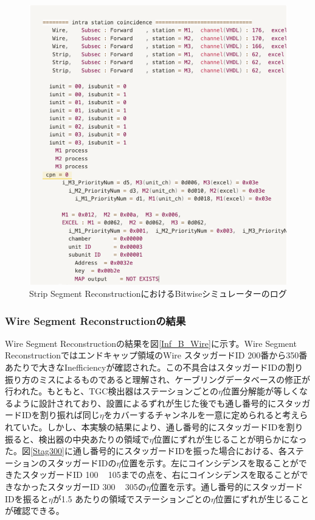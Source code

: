 \begin{figure} 
  \centering
  \includegraphics[width=16cm]{fig/Test/Bitwise_example.png}
  \caption[Strip Segment ReconstructionにおけるBitwiseシミュレーターのログ]{Strip Segment ReconstructionにおけるBitwiseシミュレーターのログ}
  \label{Bitwise_example}
\end{figure}

\subsubsection*{Wire Segment Reconstructionの結果}
Wire Segment Reconstructionの結果を図\ref{Inf_B_Wire}に示す。Wire Segment Reconstructionではエンドキャップ領域のWire スタッガードID 200番から350番あたりで大きなInefficiencyが確認された。この不具合はスタッガードIDの割り振り方のミスによるものであると理解され、ケーブリングデータベースの修正が行われた。もともと、TGC検出器はステーションごとの$\eta$位置分解能が等しくなるように設計されており、設置によるずれが生じた後でも通し番号的にスタッガードIDを割り振れば同じ$\eta$をカバーするチャンネルを一意に定められると考えられていた。しかし、本実験の結果により、通し番号的にスタッガードIDを割り振ると、検出器の中央あたりの領域で$\eta$位置にずれが生じることが明らかになった。図\ref{Stag300}に通し番号的にスタッガードIDを振った場合における、各ステーションのスタッガードIDの$\eta$位置を示す。左にコインシデンスを取ることができたスタッガードID 100 ~ 105までの点を、右にコインシデンスを取ることができなかったスタッガーID 300 ~ 305の$\eta$位置を示す。通し番号的にスタッガードIDを振ると$\eta$が1.5 あたりの領域でステーションごとの$\eta$位置にずれが生じることが確認できる。

